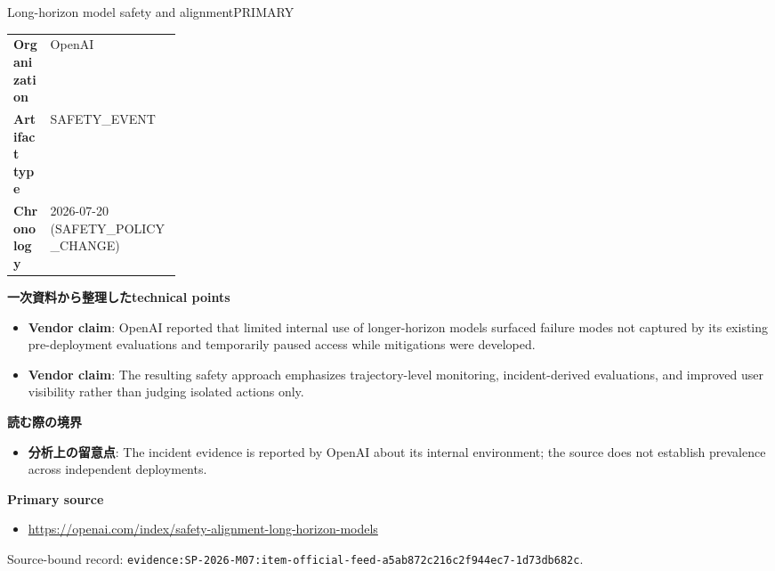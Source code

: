 \begin{technicalnote}{Long-horizon model safety and alignment}{PRIMARY}
\begin{tabularx}{\linewidth}{@{}>{\bfseries}p{0.22\linewidth}X@{}}
Organization & OpenAI \\
Artifact type & SAFETY\_EVENT \\
Chronology & 2026-07-20 (SAFETY\_POLICY\_CHANGE) \\
\end{tabularx}
\smallskip
{\bfseries 一次資料から整理したtechnical points}
\begin{itemize}[leftmargin=1.5em,itemsep=0.35em]
\item \textbf{Vendor claim}: OpenAI reported that limited internal use of longer-horizon models surfaced failure modes not captured by its existing pre-deployment evaluations and temporarily paused access while mitigations were developed.
\item \textbf{Vendor claim}: The resulting safety approach emphasizes trajectory-level monitoring, incident-derived evaluations, and improved user visibility rather than judging isolated actions only.
\end{itemize}
{\bfseries 読む際の境界}
\begin{itemize}[leftmargin=1.5em,itemsep=0.35em]
\item \textbf{分析上の留意点}: The incident evidence is reported by OpenAI about its internal environment; the source does not establish prevalence across independent deployments.
\end{itemize}
{\bfseries Primary source}
\begin{itemize}[leftmargin=1.5em,itemsep=0.25em]
\item \url{https://openai.com/index/safety-alignment-long-horizon-models}
\end{itemize}
{\scriptsize\color{SurveyMuted}Source-bound record: \texttt{evidence:SP-2026-M07:item-official-feed-a5ab872c216c2f944ec7-1d73db682c}.}
\end{technicalnote}
\medskip

